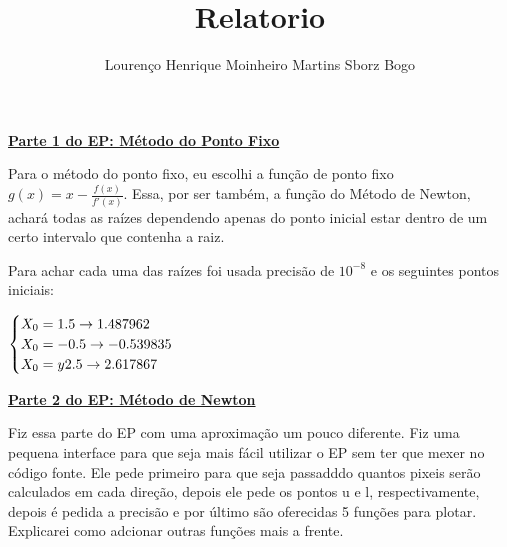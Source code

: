 \documentclass[12pt]{article}
\title{Relatorio}
\author{Lourenço Henrique Moinheiro Martins Sborz Bogo}
\date{}
\newcommand{\mytitle}[1]{\textbf{\underline{#1}}}
\begin{document}
\maketitle

\mytitle{Parte 1 do EP: Método do Ponto Fixo}

Para o método do ponto fixo, eu escolhi a função de ponto fixo $g(x) = x - \frac{f(x)}{f'(x)}$. Essa, por ser também, a função do Método de Newton, achará todas as raízes dependendo apenas do ponto inicial estar dentro de um certo intervalo que contenha a raiz.

Para achar cada uma das raízes foi usada precisão de $10^{-8}$ e os seguintes pontos iniciais:

$
\begin{cases}
  
  X_0 = 1.5 \to 1.487962 \\
  X_0 = -0.5 \to -0.539835 \\
  X_0 = y2.5 \to 2.617867 
  
\end{cases}\\
$

\mytitle{Parte 2 do EP: Método de Newton}

Fiz essa parte do EP com uma aproximação um pouco diferente. Fiz uma pequena interface para que seja mais fácil utilizar o EP sem ter que mexer no código fonte. Ele pede primeiro para que seja passadddo quantos pixeis serão calculados em cada direção, depois ele pede os pontos u e l, respectivamente, depois é pedida a precisão e por último
são oferecidas 5 funções para plotar. Explicarei como adcionar outras funções mais a frente.
\end{document}
